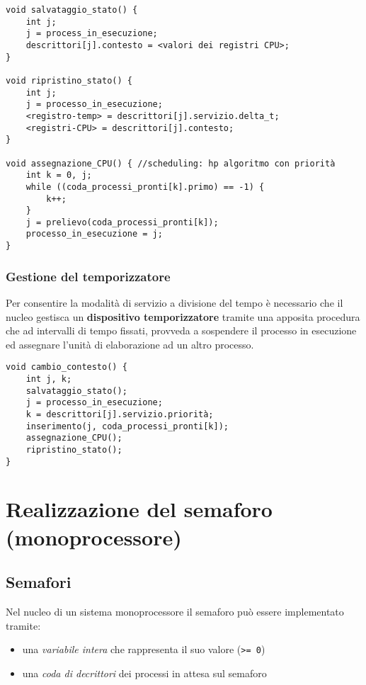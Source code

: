 \begin{verbatim}
void salvataggio_stato() {
    int j;
    j = process_in_esecuzione;
    descrittori[j].contesto = <valori dei registri CPU>;
}

void ripristino_stato() {
    int j;
    j = processo_in_esecuzione;
    <registro-temp> = descrittori[j].servizio.delta_t;
    <registri-CPU> = descrittori[j].contesto;
}

void assegnazione_CPU() { //scheduling: hp algoritmo con priorità
    int k = 0, j;
    while ((coda_processi_pronti[k].primo) == -1) {
        k++;
    }
    j = prelievo(coda_processi_pronti[k]);
    processo_in_esecuzione = j;
}
\end{verbatim}

\subsubsection{Gestione del temporizzatore}
Per consentire la modalità di servizio a divisione del tempo è necessario che il nucleo gestisca un \textbf{dispositivo temporizzatore} tramite una apposita procedura che ad intervalli di tempo fissati, provveda a sospendere il processo in esecuzione ed assegnare l'unità di elaborazione ad un altro processo.

\begin{verbatim}
void cambio_contesto() {
    int j, k;
    salvataggio_stato();
    j = processo_in_esecuzione;
    k = descrittori[j].servizio.priorità;
    inserimento(j, coda_processi_pronti[k]);
    assegnazione_CPU();
    ripristino_stato();
}
\end{verbatim}

\section{Realizzazione del semaforo (monoprocessore)}

\subsection{Semafori}

Nel nucleo di un sistema monoprocessore il semaforo può essere implementato tramite:
\begin{itemize}
    \item una \textit{variabile intera} che rappresenta il suo valore (\texttt{>= 0})
    \item una \textit{coda di decrittori} dei processi in attesa sul semaforo
\end{itemize}


